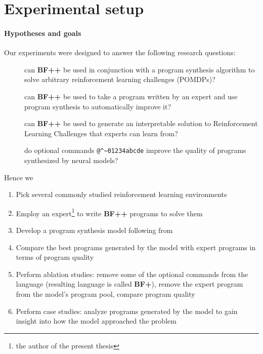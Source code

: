 \newpage
\section{Experimental setup}
\label{sec:bfpp-experiments}

\paragraph{Hypotheses and goals}
\label{sec:exgoals}

Our experiments were designed to answer the following research questions:

\begin{description}
    \item[\rqbfpp] can \textbf{BF++} be used in conjunction with a program synthesis algorithm to solve arbitrary reinforcement learning challenges (POMDPs)?
    \item[\rqbfppexpert] can \textbf{BF++} be used to take a program written by an expert and use program synthesis to automatically improve it?
    \item[\rqbfppexplainable] can \textbf{BF++} be used to generate an interpretable solution to Reinforcement Learning Challenges that experts can learn from?
    \item[\rqbfppablation] do optional commands \verb|@^~01234abcde| improve the quality of programs synthesized by neural models?
\end{description}

Hence we

\begin{enumerate}
    \item Pick several commonly studied reinforcement learning environments
    \item Employ an expert\footnote{the author of the present thesis} to write \textbf{BF++} programs to solve them
    \item Develop a program synthesis model following from \cite{abolafiaNeuralProgramSynthesis2018}
    \item Compare the best programs generated by the model with expert programs in terms of program quality
    \item Perform ablation studies: remove some of the optional commands from the language (resulting language is called \textbf{BF+}), remove the expert program from the model's program pool, compare program quality
    \item Perform case studies: analyze programs generated by the model to gain insight into how the model approached the problem
\end{enumerate}

